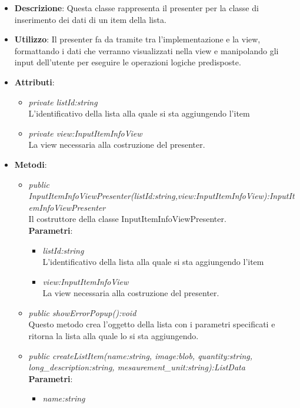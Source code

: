 \begin{itemize}
\item \textbf{Descrizione}: Questa classe rappresenta il presenter per la classe di inserimento dei dati di un item della lista.
\item \textbf{Utilizzo}: Il presenter fa da tramite tra l'implementazione e la view, formattando i dati che verranno visualizzati nella view e manipolando gli input dell'utente per eseguire le operazioni logiche predisposte.
\item \textbf{Attributi}: 
	\begin{itemize}
	\item \textit{private listId:string}\\
	L'identificativo della lista alla quale si sta aggiungendo l'item
	\item \textit{private view:InputItemInfoView}\\
	La view necessaria alla costruzione del presenter.
	\end{itemize}
\item \textbf{Metodi}:
	\begin{itemize}
	\item \textit{public InputItemInfoViewPresenter(listId:string,view:InputItemInfoView):InputItemInfoViewPresenter}\\
	Il costruttore della classe InputItemInfoViewPresenter.
					\\ \textbf{Parametri}: \begin{itemize}
			\item \textit{listId:string}\\
			L'identificativo della lista alla quale si sta aggiungendo l'item
			\item \textit{view:InputItemInfoView}\\
			La view necessaria alla costruzione del presenter.
					\end{itemize} 
	\item \textit{public showErrorPopup():void}\\
	Questo metodo crea l'oggetto della lista con i parametri specificati e ritorna la lista alla quale lo si sta aggiungendo.
	\item \textit{public createListItem(name:string, image:blob, quantity:string, long_description:string, mesaurement\_unit:string):ListData}
						\\ \textbf{Parametri}: \begin{itemize}
			\item \textit{name:string}\\

\end{itemize}
\end{itemize}
\end{itemize}
